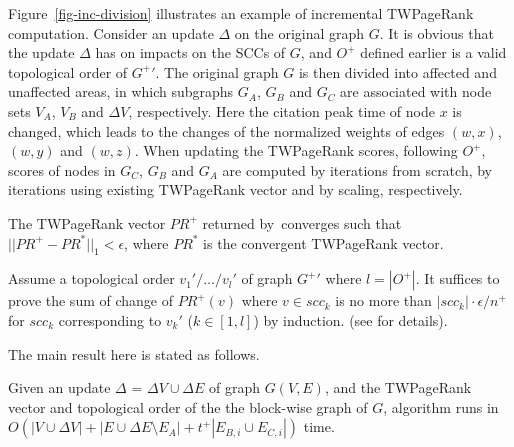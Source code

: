 \begin{example} \label{eg-layer-dag}
Figure~\ref{fig-inc-division} illustrates an example of incremental TWPageRank computation. Consider an update $\Delta$ on the original graph $G$. It is obvious that the update $\Delta$ has on impacts on the SCCs of $G$, and $O^+$ defined earlier is a valid topological order of $G^+{'}$. The original graph $G$ is then divided into affected and unaffected areas, in which subgraphs $G_A$, $G_B$ and $G_C$ are associated with node sets $V_A$, $V_B$ and $\Delta V$, respectively. Here the citation peak time of node $x$ is changed, which leads to the changes of the normalized weights of edges $(w,x)$, $(w,y)$ and $(w,z)$. When updating the TWPageRank scores, following $O^+$, scores of nodes in $G_C$, $G_B$ and $G_A$ are computed by iterations from scratch, by iterations using existing TWPageRank vector and by scaling, respectively.
\end{example}

\begin{theorem}
\label{lemma-subgraphA}
The TWPageRank vector $PR^+$ returned by~\inctwprscc converges such that $||PR^+-PR^{*}||_1 < \epsilon$, where $PR^{*}$ is the convergent TWPageRank vector.
\end{theorem}

\begin{proofSketch}
Assume a topological order $v_1'/\dots/v_{l}'$ of graph $G^+{'}$ where $l=|O^+|$. It suffices to prove the sum of change of $PR^+(v)$ where $v\in scc_k$ is no more than $|scc_k|\cdot\epsilon/n^+$ for $scc_k$ corresponding to $v_k'$ ($k\in [1,l]$) by induction.
(see \cite{SARank-full} for details).
\end{proofSketch}


The main result here is stated as follows.


\begin{prop} \label{lemma-inc-citation-comp}
Given an update $\Delta$ = $\Delta V\cup\Delta E$ of graph $G(V,E)$, and the TWPageRank vector and topological order of the  the
block-wise graph of $G$, algorithm \inctwprscc runs in $O(|V\cup \Delta V|+|E\cup\Delta E\setminus E_A|+t^+|E_{B,i}\cup E_{C,i}|)$ time.
\end{prop}

